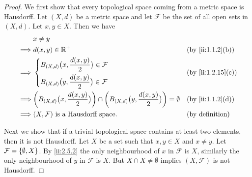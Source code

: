 \begin{proof}
  We first show that every topological space coming from a metric space is Hausdorff.
  Let \((X, d)\) be a metric space and let \(\mathcal{F}\) be the set of all open sets in \((X, d)\).
  Let \(x, y \in X\).
  Then we have
  \begin{align*}
             & x \neq y                                                                                                                                                 \\
    \implies & d(x, y) \in \R^+                                                                                                             &  & \by{ii:1.1.2}[b]       \\
    \implies & \begin{dcases}
                 B_{(X, d)}\big(x, \dfrac{d(x, y)}{2}\big) \in \mathcal{F} \\
                 B_{(X, d)}\big(y, \dfrac{d(x, y)}{2}\big) \in \mathcal{F}
               \end{dcases}                                                            &  & \by{ii:1.2.15}[c]                                                           \\
    \implies & \bigg(B_{(X, d)}\big(x, \dfrac{d(x, y)}{2}\big)\bigg) \cap \bigg(B_{(X, d)}\big(y, \dfrac{d(x, y)}{2}\big)\bigg) = \emptyset &  & \by{ii:1.1.2}[d]       \\
    \implies & (X, \mathcal{F}) \text{ is a Hausdorff space}.                                                                               &  & \text{(by definition)}
  \end{align*}

  Next we show that if a trivial topological space contains at least two elements, then it is not Hausdorff.
  Let \(X\) be a set such that \(x, y \in X\) and \(x \neq y\).
  Let \(\mathcal{F} = \left\lbrace\emptyset, X\right\rbrace\).
  By \cref{ii:2.5.2} the only neighbourhood of \(x\) in \(\mathcal{F}\) is \(X\), similarly the only neighbourhood of \(y\) in \(\mathcal{F}\) is \(X\).
  But \(X \cap X \neq \emptyset\) implies \((X, \mathcal{F})\) is not Hausdorff.


\end{proof}
